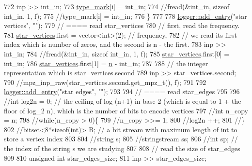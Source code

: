 \begin{DoxyCode}
772     inp >> int\_in;
773     \hyperlink{classmarked__graph__compressed_a86b00223525703e973415cbc9c94da68}{type\_mark}[i] = int\_in;
774     \textcolor{comment}{//fread(&int\_in, sizeof int\_in, 1, f);}
775     \textcolor{comment}{//type\_mark[i] = int\_in;}
776   \}
777 
778   \hyperlink{classlogger_a710163deb17bc81f70d53d285b8ac9ac}{logger::add\_entry}(\textcolor{stringliteral}{"star vertices"}, \textcolor{stringliteral}{""});
779   \textcolor{comment}{// ==== read star\_vertices}
780   \textcolor{comment}{// first, read the frequency.}
781   \hyperlink{classmarked__graph__compressed_a7a4ced4586e2e353f9076bd447df5208}{star\_vertices}.first = vector<int>(2); \textcolor{comment}{// frequency,}
782   \textcolor{comment}{// we read its first index which is number of zeros, and the second is n - the first.}
783   inp >> int\_in;
784   \textcolor{comment}{//fread(&int\_in, sizeof int\_in, 1, f);}
785   \hyperlink{classmarked__graph__compressed_a7a4ced4586e2e353f9076bd447df5208}{star\_vertices}.first[0] = int\_in;
786   \hyperlink{classmarked__graph__compressed_a7a4ced4586e2e353f9076bd447df5208}{star\_vertices}.first[1] = \hyperlink{classmarked__graph__compressed_a8d841016ddb11cfd33748c8deb6277ba}{n} - int\_in;
787 
788   \textcolor{comment}{// the integer representation which is star\_vertices.second}
789   inp >> \hyperlink{classmarked__graph__compressed_a7a4ced4586e2e353f9076bd447df5208}{star\_vertices}.second;
790   \textcolor{comment}{//mpz\_inp\_raw(star\_vertices.second.get\_mpz\_t(), f);}
791 
792   \hyperlink{classlogger_a710163deb17bc81f70d53d285b8ac9ac}{logger::add\_entry}(\textcolor{stringliteral}{"star edges"}, \textcolor{stringliteral}{""});
793 
794   \textcolor{comment}{// ==== read star\_edges}
795 
796   \textcolor{comment}{//int log2n = 0; // the ceiling of log (n+1) in base 2 (which is equal to 1 + the floor of log\_2 n),
       which is the number of bits to encode vertices}
797   \textcolor{comment}{//int n\_copy = n;}
798   \textcolor{comment}{//while(n\_copy > 0)\{}
799   \textcolor{comment}{//n\_copy >>= 1;}
800   \textcolor{comment}{//log2n ++;}
801   \textcolor{comment}{//\}}
802   \textcolor{comment}{//bitset<8*sizeof(int)> B; // a bit stream with maximum length of int to store a vertex index}
803 
804   \textcolor{comment}{//string s;}
805   \textcolor{comment}{//stringstream ss;}
806   \textcolor{comment}{//int sp; // the index of the string s we are studying }
807 
808   \textcolor{comment}{// read the size of star\_edges}
809 
810   \textcolor{keywordtype}{unsigned} \textcolor{keywordtype}{int} star\_edges\_size;
811   inp >> star\_edges\_size;

\end{DoxyCode}
